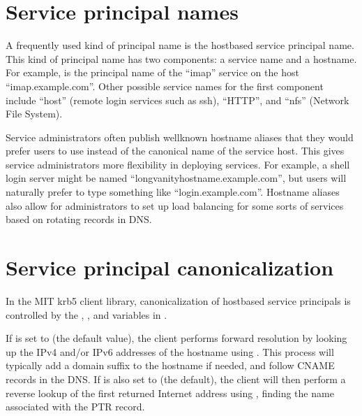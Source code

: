 \documentclass[letterpaper,10pt,english]{sphinxmanual}
\begin{document}
\section{Service principal names}
\label{\detokenize{admin/princ_dns:service-principal-names}}
\sphinxAtStartPar
A frequently used kind of principal name is the host\sphinxhyphen{}based service
principal name.  This kind of principal name has two components: a
service name and a hostname.  For example, 
is the principal name of the “imap” service on the host
“imap.example.com”.  Other possible service names for the first
component include “host” (remote login services such as ssh), “HTTP”,
and “nfs” (Network File System).

\sphinxAtStartPar
Service administrators often publish well\sphinxhyphen{}known hostname aliases that
they would prefer users to use instead of the canonical name of the
service host.  This gives service administrators more flexibility in
deploying services.  For example, a shell login server might be named
“long\sphinxhyphen{}vanity\sphinxhyphen{}hostname.example.com”, but users will naturally prefer to
type something like “login.example.com”.  Hostname aliases also allow
for administrators to set up load balancing for some sorts of services
based on rotating  records in DNS.


\section{Service principal canonicalization}
\label{\detokenize{admin/princ_dns:service-principal-canonicalization}}
\sphinxAtStartPar
In the MIT krb5 client library, canonicalization of host\sphinxhyphen{}based service
principals is controlled by the ,
, and  variables in {\hyperref[\detokenize{admin/conf_files/krb5_conf:libdefaults}]{}}.

\sphinxAtStartPar
If  is set to  (the default
value), the client performs forward resolution by looking up the IPv4
and/or IPv6 addresses of the hostname using .  This
process will typically add a domain suffix to the hostname if needed,
and follow CNAME records in the DNS.  If  is also set to
 (the default), the client will then perform a reverse lookup
of the first returned Internet address using ,
finding the name associated with the PTR record.
\end{document}

